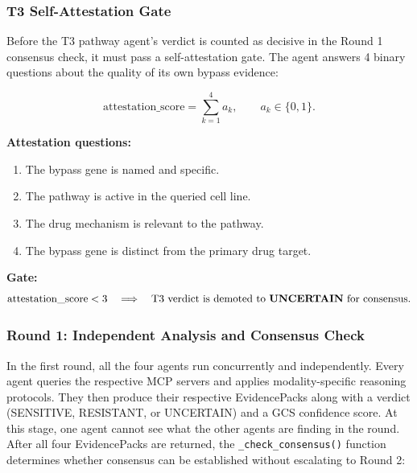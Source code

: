 \documentclass{article}
\begin{document}
\subsubsection{T3 Self-Attestation Gate}
Before the T3 pathway agent's verdict is counted as decisive in the Round 1 consensus check, it must pass a self-attestation gate. The agent answers 4 binary questions about the quality of its own bypass evidence:

\[
\mathrm{attestation\_score}
=
\sum_{k=1}^{4} a_k,
\qquad
a_k \in \{0,1\}.
\]

\noindent\textbf{Attestation questions:}
\begin{enumerate}[label=(\arabic*), leftmargin=*]
    \item The bypass gene is named and specific.
    \item The pathway is active in the queried cell line.
    \item The drug mechanism is relevant to the pathway.
    \item The bypass gene is distinct from the primary drug target.
\end{enumerate}

\noindent\textbf{Gate:}
\[
\mathrm{attestation\_score}<3
\quad\Longrightarrow\quad
\text{T3 verdict is demoted to \textbf{UNCERTAIN} for consensus.}
\]

\subsubsection{Round 1: Independent Analysis and Consensus Check}
In the first round, all the four agents run concurrently and independently. Every agent queries the respective MCP servers and applies modality-specific reasoning protocols. They then produce their respective EvidencePacks along with a verdict (SENSITIVE, RESISTANT, or UNCERTAIN) and a GCS confidence score. At this stage, one agent cannot see what the other agents are finding in the round. 
After all four EvidencePacks are returned, the \texttt{\_check\_consensus()} function determines whether consensus can be established without escalating to Round 2:
\end{document}
